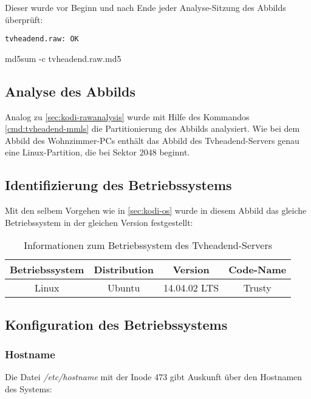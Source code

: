Dieser wurde vor Beginn und nach Ende jeder Analyse-Sitzung des Abbilds überprüft:

\begin{cmd}
\begin{verbatim}
tvheadend.raw: OK
\end{verbatim}
\caption{md5sum -c tvheadend.raw.md5}
\end{cmd}

\subsection{Analyse des Abbilds}

Analog zu \autoref{sec:kodi-rawanalysis} wurde mit Hilfe des Kommandos \autoref{cmd:tvheadend-mmls} die Partitionierung des Abbilds analysiert. Wie bei dem Abbild des Wohnzimmer-PCs enthält das Abbild des Tvheadend-Servers genau eine Linux-Partition, die bei Sektor 2048 beginnt.

\subsection{Identifizierung des Betriebssystems}
\label{sec:tvheadend-os}

Mit den selbem Vorgehen wie in \autoref{sec:kodi-os} wurde in diesem Abbild das gleiche Betriebssystem in der gleichen Version festgestellt:

\begin{table}[H]
\centering
\begin{tabular}{cccc}
\hline 
Betriebssystem & Distribution & Version & Code-Name \\ 
\hline 
Linux & Ubuntu & 14.04.02 LTS & Trusty \\ 
\hline 
\end{tabular} 
\caption{Informationen zum Betriebssystem des Tvheadend-Servers}
\label{table:tvheadend-os}
\end{table}

\subsection{Konfiguration des Betriebssystems}

\subsubsection{Hostname}
\label{sec:tvheadend-hostname}

Die Datei \textit{/etc/hostname} mit der Inode 473 gibt Auskunft über den Hostnamen des Systems:

